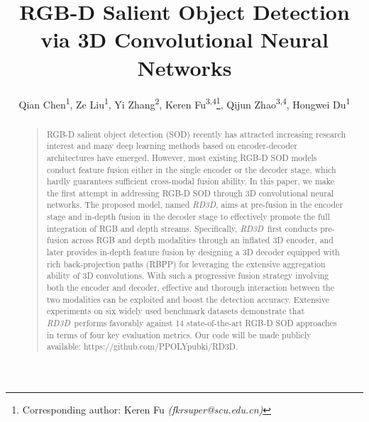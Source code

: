 \documentclass[letterpaper]{article}
\def\ourmodel{\emph{RD3D}}
\begin{document}
\title{RGB-D Salient Object Detection via 3D Convolutional Neural Networks}
\author{Qian Chen\textsuperscript{\rm 1}, Ze Liu\textsuperscript{\rm 1}, Yi Zhang\textsuperscript{\rm 2}, Keren Fu\textsuperscript{\rm 3,4}\thanks{Corresponding author: Keren Fu \emph{(fkrsuper@scu.edu.cn)}}, Qijun Zhao\textsuperscript{\rm 3,4}, Hongwei Du\textsuperscript{\rm 1}\\
}
\maketitle
\begin{abstract}
\begin{quote}

RGB-D salient object detection (SOD) recently has attracted increasing research interest and many deep learning methods based on encoder-decoder architectures have emerged. However, most existing RGB-D SOD models conduct feature fusion either in the single encoder or the decoder stage, which hardly guarantees sufficient cross-modal fusion ability.
In this paper, we make the first attempt in addressing RGB-D SOD through 3D convolutional neural networks. The proposed model, named \ourmodel, aims at pre-fusion in the encoder stage and in-depth fusion in the decoder stage to effectively promote the full integration of RGB and depth streams.
Specifically, \ourmodel~first conducts pre-fusion across RGB and depth modalities through an inflated 3D encoder, and later provides in-depth feature fusion by designing a 3D decoder equipped with rich back-projection paths (RBPP) for leveraging the extensive aggregation ability of 3D convolutions. With such a progressive fusion strategy involving both the encoder and decoder, effective and thorough interaction between the two modalities can be exploited and boost the detection accuracy. Extensive experiments on six widely used benchmark datasets demonstrate that \ourmodel~performs favorably against 14 state-of-the-art RGB-D SOD approaches in terms of four key evaluation metrics. Our code will be made publicly available: https://github.com/PPOLYpubki/RD3D.
\end{quote}
\end{abstract}
\end{document}
